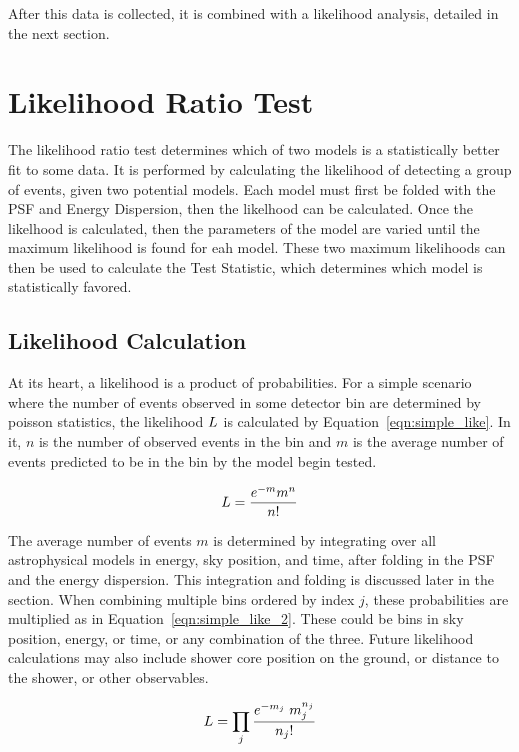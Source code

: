   After this data is collected, it is combined with a likelihood analysis, detailed in the next section.

\section{Likelihood Ratio Test}
  The likelihood ratio test determines which of two models is a statistically better fit to some data.
  It is performed by calculating the likelihood of detecting a group of events, given two potential models.
  Each model must first be folded with the PSF and Energy Dispersion, then the likelhood can be calculated.
  Once the likelhood is calculated, then the parameters of the model are varied until the maximum likelihood is found for eah model.
  These two maximum likelihoods can then be used to calculate the Test Statistic, which determines which model is statistically favored.
  
  \subsection{Likelihood Calculation}
  At its heart, a likelihood is a product of probabilities.
  For a simple scenario where the number of events observed in some detector bin are determined by poisson statistics, the likelihood $L$ is calculated by Equation~\ref{eqn:simple_like}.
  In it, $n$ is the number of observed events in the bin and $m$ is the average number of events predicted to be in the bin by the model begin tested.
  
  \begin{equation}\label{eqn:simple_like}
    L = \frac{e^{-m} m^n}{n!}
  \end{equation}
  
  The average number of events $m$ is determined by integrating over all astrophysical models in energy, sky position, and time, after folding in the PSF and the energy dispersion.
  This integration and folding is discussed later in the section.
  When combining multiple bins ordered by index $j$, these probabilities are multiplied as in Equation~\ref{eqn:simple_like_2}.
  These could be bins in sky position, energy, or time, or any combination of the three.
  Future likelihood calculations may also include shower core position on the ground, or distance to the shower, or other observables.
  
  \begin{equation}\label{eqn:simple_like_2}
    L = \prod_j \frac{ e^{-m_j} \; m_{j}^{n_j}}{n_{j}!}
  \end{equation}


